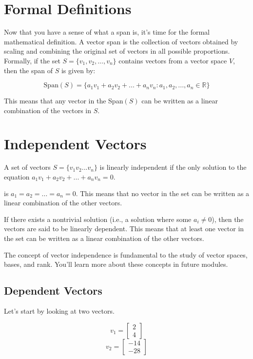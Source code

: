 \section{Formal Definitions}
Now that you have a sense of what a span is, it's time for the formal mathematical definition. A vector span is the collection of vectors obtained by scaling and combining the original set of vectors in all possible proportions.  Formally, if the set $S = \{v_1, v_2, ..., v_n\}$ contains vectors from a vector space $V$, then the span of $S$ is given by:

\begin{equation}
\text{Span}(S) = \{a_1v_1 + a_2v_2 + ... + a_nv_n : a_1, a_2, ..., a_n \in \mathbb{R}\}
\end{equation}

This means that any vector in the Span$(S)$ can be written as a linear combination of the vectors in $S$.

\section{Independent Vectors}
A set of vectors $S = \{v_1 v_2 ... v_n\}$ is  linearly independent if the only solution to the equation $a_1v_1 + a_2v_2 + ... + a_nv_n = 0$.

is $a_1 = a_2 = ... = a_n = 0$. This means that no vector in the set can be written as a linear combination of the other vectors.

If there exists a nontrivial solution (i.e., a solution where some $a_i \neq 0$), then the vectors are said to be linearly dependent. This means that at least one vector in the set can be written as a linear combination of the other vectors.

The concept of vector independence is fundamental to the study of vector spaces, bases, and rank. You'll learn more about these concepts in future modules. 

\subsection{Dependent Vectors}
Let's start by looking at two vectors. 

$$v_1 = \begin{bmatrix}
			2 \\
			4
		\end{bmatrix}$$
$$v_2 = \begin{bmatrix}
			-14 \\
			-28
\end{bmatrix}$$

